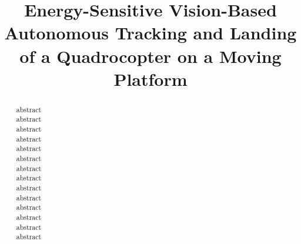 \documentclass[conference]{IEEEtran}
\begin{document}


\title{Energy-Sensitive Vision-Based Autonomous Tracking and Landing of a Quadrocopter on a Moving Platform} %

\author{
}

\maketitle


\begin{abstract}

abstract\\
abstract\\
abstract\\
abstract\\
abstract\\
abstract\\
abstract\\
abstract\\
abstract\\
abstract\\
abstract\\
abstract\\
abstract\\
abstract

\end{abstract}

%
\IEEEpeerreviewmaketitle
\end{document}
